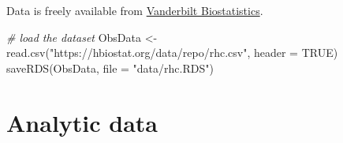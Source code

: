 \documentclass[
]{book}
\newenvironment{Shaded}{\begin{snugshade}}{\end{snugshade}}
\newcommand{\AttributeTok}[1]{\textcolor[rgb]{0.77,0.63,0.00}{#1}}
\newcommand{\CommentTok}[1]{\textcolor[rgb]{0.56,0.35,0.01}{\textit{#1}}}
\newcommand{\ConstantTok}[1]{\textcolor[rgb]{0.00,0.00,0.00}{#1}}
\newcommand{\FunctionTok}[1]{\textcolor[rgb]{0.00,0.00,0.00}{#1}}
\newcommand{\NormalTok}[1]{#1}
\newcommand{\OtherTok}[1]{\textcolor[rgb]{0.56,0.35,0.01}{#1}}
\newcommand{\StringTok}[1]{\textcolor[rgb]{0.31,0.60,0.02}{#1}}
\begin{document}
Data is freely available from \href{https://hbiostat.org/data/}{Vanderbilt Biostatistics}.

\begin{Shaded}
\begin{Highlighting}[]
\CommentTok{\# load the dataset}
\NormalTok{ObsData }\OtherTok{\textless{}{-}} \FunctionTok{read.csv}\NormalTok{(}\StringTok{"https://hbiostat.org/data/repo/rhc.csv"}\NormalTok{, }\AttributeTok{header =} \ConstantTok{TRUE}\NormalTok{)}
\FunctionTok{saveRDS}\NormalTok{(ObsData, }\AttributeTok{file =} \StringTok{"data/rhc.RDS"}\NormalTok{)}
\end{Highlighting}
\end{Shaded}

\hypertarget{analytic-data}{%
\section{Analytic data}\label{analytic-data}}
\end{document}
